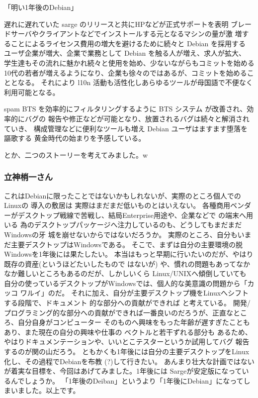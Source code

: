 \documentclass[mingoth]{jsarticle}
\begin{document}
「明い1年後のDebian」

遅れに遅れていた sarge のリリースと共にHPなどが正式サポートを表明
ブレードサーバやクライアントなどでインストールする元となるマシンの量が激
増することによるライセンス費用の増大を避けるために続々と Debian を採用する
ユーザ企業が増大、企業で業務として Debian を触る人が増え、求人が拡大、
学生達もその流れに魅かれ続々と使用を始め、少ないながらもコミットを始める
10代の若者が増えるようになり、企業も徐々のではあるが、コミットを始めることとなる。
それにより l10n 活動も活性化しあらゆるツールが母国語で不便なく利用可能となる。

spam BTS を効率的にフィルタリングするように BTS システム が改善され、効率的にバグの
報告や修正などが可能となり、放置されるバグは続々と解消されていき、
構成管理などに便利なツールも増え Debian ユーザはますます堕落を謳歌する
黄金時代の始まりを予感している。

とか、二つのストーリーを考えてみました。w

\subsubsection{立神梢一さん}

これはDebianに限ったことではないかもしれないが、実際のところ個人でのLinuxの
導入の敷居は
実際はまだまだ低いものとはいえない。
各種商用ベンダーがデスクトップ戦線で苦戦し、結局Enterprise用途や、企業などで
の端末へ用いる
為のデスクトップパッケージへ注力しているのも、どうしてもまだまだWindowsの牙
城を崩せないからではないだろうか。
実際のところ、自分もいまだ主要デスクトップはWindowsである。
そこで、まずは自分の主要環境の脱Windowsを1年後には果たしたい。
本当はもっと早期に行いたいのだが、やはり既存の資産(というほどたいしたもので
はないが)
や、慣れの問題もあってなかなか難しいところもあるのだが、しかしいくら
Linux/UNIXへ傾倒していても
自分の使っているデスクトップがWindowsでは、個人的な美意識の問題から「カッコ
ワルイ」のだ。
それに加え、自分が主要デスクトップ機をLinuxへシフトする段階で、ドキュメント
的な部分への貢献ができれば
と考えている。
開発/プログラミング的な部分への貢献ができれば一番良いのだろうが、正直なとこ
ろ、自分自身がコンピューター
そのものへ興味をもった年齢が遅すぎたこともあり、また現在の自分の興味や仕事の
ベクトルと若干ずれる部分も
あるため、やはりドキュメンテーションや、いいとこテスターというか試用してバグ
報告するのが関の山だろう。
ともかくも1年後には自分の主要デスクトップをLinux化し、その過程でDebianを布教
(?)して行きたい。
あんまり壮大な計画ではないが着実な目標を、今回はあげてみました。1年後には
Sargeが安定版になっているんでしょうか。
「1年後のDeiban」というより「1年後にDebian」になってしまいました。以上です。
\end{document}
